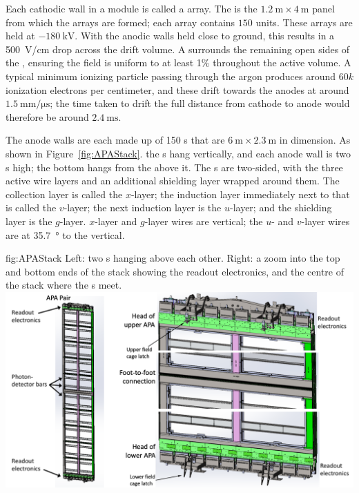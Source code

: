 Each cathodic wall in a module is called a  array. The  is the $\SI{1.2}{\meter}\times\SI{4}{\meter}$ panel from which the  arrays are formed; each  array contains $150$  units. These  arrays are held at $-\SI{180}{\kilo\volt}$. With the anodic walls held close to ground, this results in a \SI{500}{\volt/\centi\meter} drop across the drift volume. A  surrounds the remaining open sides of the , ensuring the field is uniform to at least 1\% throughout the active volume. A typical minimum ionizing particle passing through the argon produces around $60k$ ionization electrons per centimeter, and these drift towards the anodes at around $\SI{1.5}{\mm/\micro\second}$; the time taken to drift the full distance from cathode to anode would therefore be around $\SI{2.4}{\milli\second}$.

The anode walls are each made up of 150 s that are $\SI{6}{\meter}\times\SI{2.3}{\meter}$ in dimension. As shown in Figure~\ref{fig:APAStack}. the s hang vertically, and each anode wall is two s high; the bottom  hangs from the  above it. The s are two-sided, with the three active wire layers and an additional shielding layer wrapped around them. The collection layer is called the $x$-layer; the induction layer immediately next to that is called the $v$-layer; the next induction layer is the $u$-layer; and the shielding layer is the $g$-layer. $x$-layer and $g$-layer wires are vertical; the $u$- and $v$-layer wires are at \SI{35.7}{\degree} to the vertical.

\begin{dunefigure}{fig:APAStack}
{Left: two s hanging above each other. Right: a zoom into the top and bottom ends of the  stack showing the readout electronics, and the centre of the stack where the s meet.}
\includegraphics[width=\textwidth]{graphics/APAStack.pdf}
\end{dunefigure}

